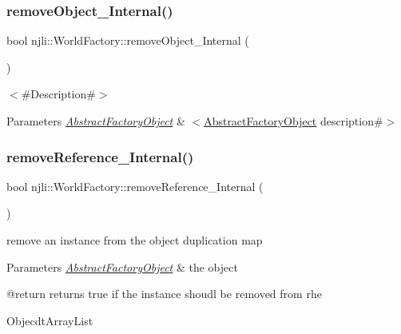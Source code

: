 \subsubsection{\texorpdfstring{remove\+Object\+\_\+\+Internal()}{removeObject\_Internal()}}
{\footnotesize\ttfamily bool njli\+::\+World\+Factory\+::remove\+Object\+\_\+\+Internal (\begin{DoxyParamCaption}\item[{\mbox{\hyperlink{classnjli_1_1_abstract_factory_object}{Abstract\+Factory\+Object}} $\ast$}]{ }\end{DoxyParamCaption})\hspace{0.3cm}{\ttfamily [protected]}}

$<$\#\+Description\#$>$


\begin{DoxyParams}{Parameters}
{\em \mbox{\hyperlink{classnjli_1_1_abstract_factory_object}{Abstract\+Factory\+Object}}} & $<$\mbox{\hyperlink{classnjli_1_1_world_factory_a59f5fcb165066624f68fb5417aa3586e}{Abstract\+Factory\+Object}} description\#$>$ \\
\hline
\end{DoxyParams}
\mbox{\label{classnjli_1_1_world_factory_a739d97d5e0c332971564768bfa5e12c5}} 
\subsubsection{\texorpdfstring{remove\+Reference\+\_\+\+Internal()}{removeReference\_Internal()}}
{\footnotesize\ttfamily bool njli\+::\+World\+Factory\+::remove\+Reference\+\_\+\+Internal (\begin{DoxyParamCaption}\item[{\mbox{\hyperlink{classnjli_1_1_abstract_factory_object}{Abstract\+Factory\+Object}} $\ast$}]{ }\end{DoxyParamCaption})\hspace{0.3cm}{\ttfamily [protected]}}

remove an instance from the object duplication map


\begin{DoxyParams}{Parameters}
{\em \mbox{\hyperlink{classnjli_1_1_abstract_factory_object}{Abstract\+Factory\+Object}}} & the object \begin{DoxyVerb} @return returns true if the instance shoudl be removed from rhe
\end{DoxyVerb}
 Objecdt\+Array\+List \\
\hline
\end{DoxyParams}
\mbox{\label{classnjli_1_1_world_factory_af107111eceb194bc9ca7623c09f617d6}} 
